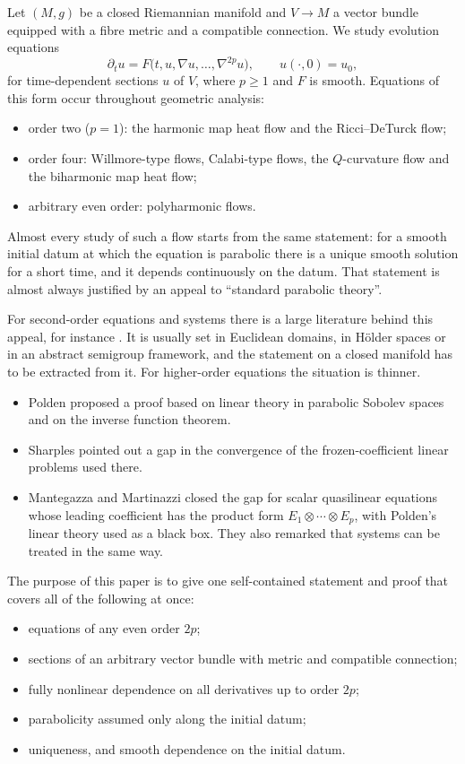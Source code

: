 \documentclass[11pt,reqno]{amsart}
\theoremstyle{definition}
\theoremstyle{remark}
\numberwithin{equation}{section}
\begin{document}
Let $(M,g)$ be a closed Riemannian manifold and $V\to M$ a vector bundle equipped with a fibre metric
and a compatible connection. We study evolution equations
\begin{equation}\label{eq:intro}
  \partial_t u = F\bigl(t,u,\nabla u,\dots,\nabla^{2p}u\bigr),\qquad u(\cdot,0)=u_0,
\end{equation}
for time-dependent sections $u$ of $V$, where $p\ge 1$ and $F$ is smooth. Equations of this form
occur throughout geometric analysis:
\begin{itemize}[nosep]
\item order two ($p=1$): the harmonic map heat flow and the Ricci--DeTurck flow;
\item order four: Willmore-type flows, Calabi-type flows, the $Q$-curvature flow and the biharmonic
  map heat flow;
\item arbitrary even order: polyharmonic flows.
\end{itemize}
Almost every study of such a flow starts from the same statement: for a smooth initial datum at which
the equation is parabolic there is a unique smooth solution for a short time, and it depends
continuously on the datum. That statement is almost always justified by an appeal to ``standard
parabolic theory''.

For second-order equations and systems there is a large literature behind this appeal, for instance
\cite{Hamilton75,Eidelman,Solonnikov,Amann,Lunardi,Baker}. It is usually set in Euclidean domains, in
H\"older spaces or in an abstract semigroup framework, and the statement on a closed manifold has to be
extracted from it. For higher-order equations the situation is thinner.
\begin{itemize}[nosep]
\item Polden \cite{Polden} proposed a proof based on linear theory in parabolic Sobolev spaces and on
  the inverse function theorem.
\item Sharples \cite{Sharples} pointed out a gap in the convergence of the frozen-coefficient linear
  problems used there.
\item Mantegazza and Martinazzi \cite{MM} closed the gap for scalar quasilinear equations whose
  leading coefficient has the product form $E_1\otimes\cdots\otimes E_p$, with Polden's linear theory
  used as a black box. They also remarked that systems can be treated in the same way.
\end{itemize}

The purpose of this paper is to give one self-contained statement and proof that covers all of the
following at once:
\begin{itemize}[nosep]
\item equations of any even order $2p$;
\item sections of an arbitrary vector bundle with metric and compatible connection;
\item fully nonlinear dependence on all derivatives up to order $2p$;
\item parabolicity assumed only along the initial datum;
\item uniqueness, and smooth dependence on the initial datum.
\end{itemize}
\end{document}
